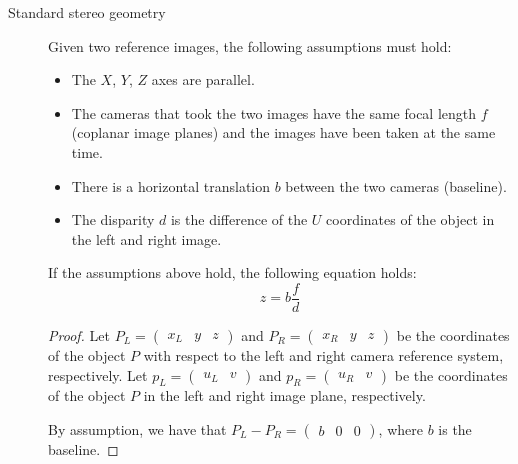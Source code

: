 \begin{description}
    \item[Standard stereo geometry] 
        Given two reference images, the following assumptions must hold:
        \begin{itemize}
            \item The $X$, $Y$, $Z$ axes are parallel. 
            \item The cameras that took the two images have the same focal length $f$ (coplanar image planes) and 
                the images have been taken at the same time.
            \item There is a horizontal translation $b$ between the two cameras (baseline).
            \item The disparity $d$ is the difference of the $U$ coordinates of the object in the left and right image.
        \end{itemize}

        \begin{theorem} 
            If the assumptions above hold, the following equation holds:
            \[ z = b\frac{f}{d} \]

            \begin{proof}
                Let $P_L = \begin{pmatrix}x_L & y & z\end{pmatrix}$ and $P_R = \begin{pmatrix}x_R & y & z\end{pmatrix}$ be the
                coordinates of the object $P$ with respect to the left and right camera reference system, respectively.
                Let $p_L = \begin{pmatrix}u_L & v\end{pmatrix}$ and $p_R = \begin{pmatrix}u_R & v\end{pmatrix}$ 
                be the coordinates of the object $P$ in the left and right image plane, respectively.
                
                By assumption, we have that $P_L - P_R = \begin{pmatrix} b & 0 & 0 \end{pmatrix}$, where $b$ is the baseline.

                \begin{minipage}{0.6\textwidth}
        

\end{minipage}
\end{proof}
\end{theorem}
\end{description}
